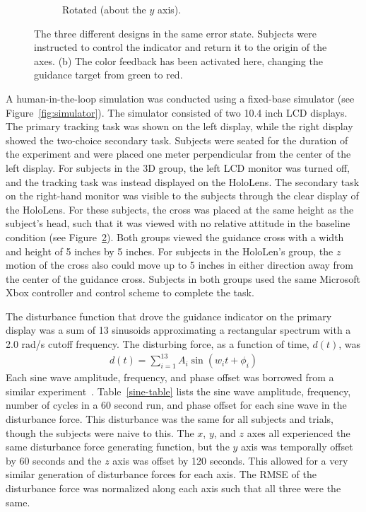\begin{figure}[t!]
\begin{center}
\begin{subfigure}{0.32\textwidth}
            \caption[Rotated (about the $y$ axis)]{Rotated (about the $y$ axis).}
            \label{fig:designs_rotated}
        \end{subfigure}
        \caption[The three different designs in the same error state]{The three different designs in the same error state. Subjects were instructed to control the indicator and return it to the origin of the axes.
            (b) The color feedback has been activated here, changing the guidance target from green to red.}
        \label{fig:designs}%
    \end{center}
\end{figure}

A human-in-the-loop simulation was conducted using a fixed-base simulator (see Figure~\ref{fig:simulator}).
The simulator consisted of two 10.4 inch LCD displays.
The primary tracking task was shown on the left display, while the right display showed the two-choice secondary task.
Subjects were seated for the duration of the experiment and were placed one meter perpendicular from the center of the left display.
For subjects in the 3D group, the left LCD monitor was turned off, and the tracking task was instead displayed on the HoloLens.
The secondary task on the right-hand monitor was visible to the subjects through the clear display of the HoloLens.
For these subjects, the cross was placed at the same height as the subject's head, such that it was viewed with no relative attitude in the baseline condition (see Figure~\ref{fig:designs}).
Both groups viewed the guidance cross with a width and height of 5 inches by 5 inches.
For subjects in the HoloLen's group, the $z$ motion of the cross also could move up to 5 inches in either direction away from the center of the guidance cross.
Subjects in both groups used the same Microsoft Xbox controller and control scheme to complete the task.

The disturbance function that drove the guidance indicator on the primary display was a sum of 13 sinusoids approximating a rectangular spectrum with a 2.0 rad/s cutoff frequency.
The disturbing force, as a function of time, $d(t)$, was
\begin{align}
    d(t) = \sum_{i=1}^{13} A_i \sin \left( w_i t + \phi_i \right)
    \label{eq:disturbance}
\end{align}
Each sine wave amplitude, frequency, and phase offset was borrowed from a similar experiment~\citep{hess_effects_1984}.
Table~\ref{sine-table} lists the sine wave amplitude, frequency, number of cycles in a 60 second run, and phase offset for each sine wave in the disturbance force.
This disturbance was the same for all subjects and trials, though the subjects were naive to this.
The $x$, $y$, and $z$ axes all experienced the same disturbance force generating function, but the $y$ axis was temporally offset by 60 seconds and the $z$ axis was offset by 120 seconds.
This allowed for a very similar generation of disturbance forces for each axis.
The RMSE of the disturbance force was normalized along each axis such that all three were the same.

